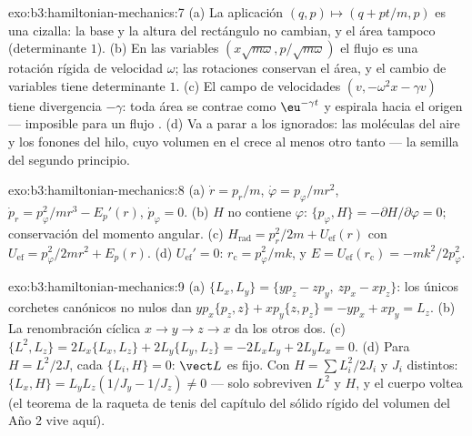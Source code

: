 \begin{solution}{exo:b3:hamiltonian-mechanics:7}
(a) La aplicación $(q, p) \mapsto (q + pt/m, p)$ es una cizalla: la base y
la altura del rectángulo no cambian, y el área tampoco (determinante $1$).
(b) En las variables $(x\sqrt{m\omega}, p/\sqrt{m\omega})$ el flujo es una
rotación rígida de velocidad $\omega$; las rotaciones conservan el área, y
el cambio de variables tiene determinante $1$. (c) El campo de velocidades
$(v, -\omega^2x - \gamma v)$ tiene divergencia $-\gamma$: toda área
se contrae como $\eu^{-\gamma t}$ y espirala hacia el origen ---
imposible para un flujo . (d) Va a parar a los  ignorados: las moléculas del aire y los fonones del hilo, cuyo
volumen en el  crece al menos otro tanto --- la semilla del
segundo principio.
\end{solution}

\begin{solution}{exo:b3:hamiltonian-mechanics:8}
(a) $\dot r = p_r/m$, $\dot\varphi = p_\varphi/mr^2$, $\dot p_r =
p_\varphi^2/mr^3 - E_p'(r)$, $\dot p_\varphi = 0$. (b) $H$ no
contiene $\varphi$: $\{p_\varphi, H\} = -\partial H/\partial\varphi =
0$; conservación del momento angular. (c) $H_{\text{rad}} = p_r^2/2m +
U_{\text{ef}}(r)$ con $U_{\text{ef}} = p_\varphi^2/2mr^2 + E_p(r)$.
(d) $U_{\text{ef}}' = 0$: $r_{\text{c}} = p_\varphi^2/mk$, y $E =
U_{\text{ef}}(r_{\text{c}}) = -mk^2/2p_\varphi^2$.
\end{solution}

\begin{solution}{exo:b3:hamiltonian-mechanics:9}
(a) $\{L_x, L_y\} = \{yp_z - zp_y,\ zp_x - xp_z\}$: los únicos
corchetes canónicos no nulos dan $yp_x\{p_z, z\} + xp_y\{z,
p_z\} = -yp_x + xp_y = L_z$. (b) La renombración cíclica $x \to y \to z \to
x$ da los otros dos. (c) $\{L^2, L_z\} = 2L_x\{L_x, L_z\} +
2L_y\{L_y, L_z\} = -2L_xL_y + 2L_yL_x = 0$. (d) Para $H = L^2/2J$,
cada $\{L_i, H\} = 0$: $\vect L$ es fijo. Con $H = \sum L_i^2/2J_i$
y $J_i$ distintos: $\{L_x, H\} = L_yL_z(1/J_y - 1/J_z) \neq 0$ ---
solo sobreviven $L^2$ y $H$, y el cuerpo voltea (el teorema de la raqueta de
tenis del capítulo del sólido rígido del volumen del Año 2 vive aquí).
\end{solution}

